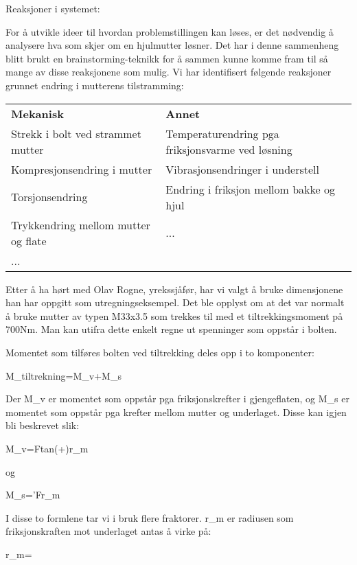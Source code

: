 
Reaksjoner i systemet:

For å utvikle ideer til hvordan problemstillingen kan løses, er det nødvendig å analysere hva som skjer om en hjulmutter løsner. Det har i denne sammenheng blitt brukt en brainstorming-teknikk for å sammen kunne komme fram til så mange av disse reaksjonene som mulig. Vi har identifisert følgende reaksjoner grunnet endring i mutterens tilstramming:

\begin{table}[h]
\begin{tabular}{ll}
\textbf{Mekanisk}                   & \textbf{Annet}                                   \\
Strekk i bolt ved strammet mutter   & Temperaturendring pga friksjonsvarme ved løsning \\
Kompresjonsendring i mutter         & Vibrasjonsendringer i understell                 \\
Torsjonsendring                     & Endring i friksjon mellom bakke og hjul          \\
Trykkendring mellom mutter og flate & ...                                              \\
...                                 &                                                 
\end{tabular}
\end{table}

Etter å ha hørt med Olav Rogne, yrekssjåfør, har vi valgt å bruke dimensjonene han har oppgitt som utregningseksempel. Det ble opplyst om at det var normalt å bruke mutter av typen M33x3.5 som trekkes til med et tiltrekkingsmoment på 700Nm. Man kan utifra dette enkelt regne ut spenninger som oppstår i bolten.

Momentet som tilføres bolten ved tiltrekking deles opp i to komponenter:

M_{tiltrekning}=M_{v}+M_{s}

Der M_{v} er momentet som oppstår pga friksjonskrefter i gjengeflaten, og M_{s} er momentet som oppstår pga krefter mellom mutter og underlaget. Disse kan igjen bli beskrevet slik:

M_{v}=F\cdot tan(\varphi +\varepsilon )\cdot r_{m}

og

M_{s}=\mu 'Fr_{m}

I disse to formlene tar vi i bruk flere fraktorer.  r_{m} er radiusen som friksjonskraften mot underlaget antas å virke på:

r_{m}=

